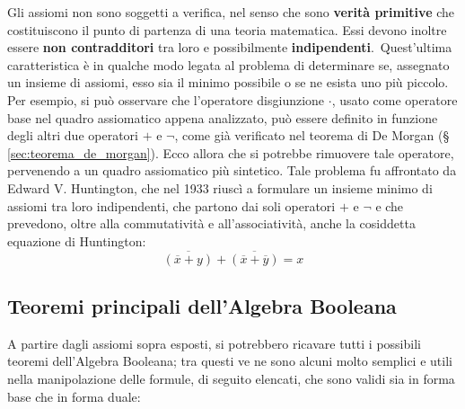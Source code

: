 \documentclass[a4paper]{extarticle}
\begin{document}
Gli assiomi non sono soggetti a verifica, nel senso che sono \textbf{verità primitive} che costituiscono il punto di partenza di una teoria matematica. Essi devono inoltre essere \textbf{non contradditori} tra loro e possibilmente \textbf{indipendenti}.\
Quest’ultima caratteristica è in qualche modo legata al problema di determinare se, assegnato un insieme di assiomi, esso sia il minimo possibile o se ne esista uno più piccolo.\\
Per esempio, si può osservare che l’operatore disgiunzione \(\cdot\), usato come operatore base nel quadro assiomatico appena analizzato, può essere definito in funzione degli altri due operatori \(+\) e \(\neg\), come già verificato nel teorema di De Morgan (§ \ref{sec:teorema_de_morgan}). Ecco allora che si potrebbe rimuovere tale operatore, pervenendo a un quadro assiomatico più sintetico. Tale problema fu affrontato da Edward V. Huntington, che nel 1933 riuscì a formulare un insieme minimo di assiomi tra loro indipendenti, che partono dai soli operatori \(+\) e \(\neg\) e che prevedono, oltre alla commutatività e all’associatività, anche la cosiddetta equazione di Huntington:
\[\overline{(\overline{x} + y)} + \overline{(\overline{x} + \overline{y})} = x\]

\subsection{Teoremi principali dell'Algebra Booleana}
A partire dagli assiomi sopra esposti, si potrebbero ricavare tutti i possibili teoremi dell’Algebra Booleana; tra questi ve ne sono alcuni molto semplici e utili nella manipolazione delle formule, di seguito elencati, che sono validi sia in forma base che in forma duale:
\end{document}
